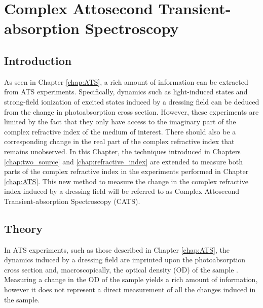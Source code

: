 \chapter{Complex Attosecond Transient-absorption Spectroscopy}
\label{chap:CATS}

\section{Introduction}
\label{sec:intro_cats}

As seen in Chapter \ref{chap:ATS}, a rich amount of information can be extracted from ATS experiments.  Specifically, dynamics such as light-induced states and strong-field ionization of  excited states induced by a dressing field can be deduced from the change in photoabsorption cross section.  However, these experiments are limited by the fact that they only have access to the imaginary part of the complex refractive index of the medium of interest. There should also be a corresponding change in the real part of the complex refractive index that remains unobserved.  In this Chapter, the techniques introduced in Chapters \ref{chap:two_source} and \ref{chap:refractive_index} are extended to measure both parts of the complex refractive index in the experiments performed in Chapter \ref{chap:ATS}.  This new method to measure the change in the complex refractive index induced by a dressing field will be referred to as Complex Attosecond Transient-absorption Spectroscopy (CATS).


\section{Theory}
\label{sec:cats_theory}

In ATS experiments, such as those described in Chapter \ref{chap:ATS}, the dynamics induced by a dressing field are imprinted upon the photoabsorption cross section and, macroscopically, the optical density (OD) of the sample \cite{wuTheoryStrongfieldAttosecond2016,geneauxromainTransientAbsorptionSpectroscopy2019}.  Measuring a change in the OD of the sample yields a rich amount of information, however it does not represent a direct measurement of all the changes induced in the sample. 

